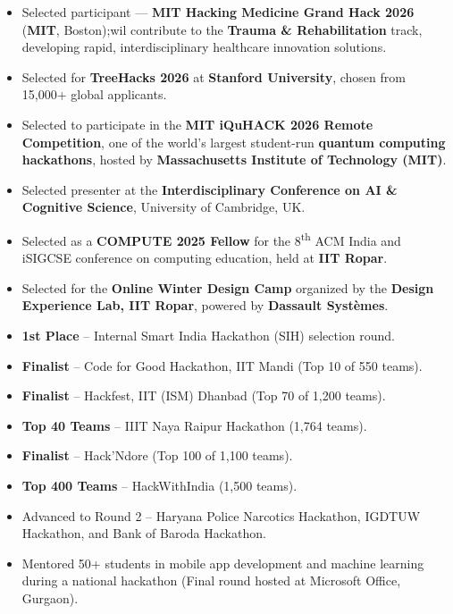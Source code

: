 \documentclass[11pt]{article}
\begin{document}
\begin{itemize}[leftmargin=*,nosep]
\item Selected participant — \textbf{MIT Hacking Medicine Grand Hack 2026} (\textbf{MIT}, Boston);wil contribute to the \textbf{Trauma \& Rehabilitation} track, developing rapid, interdisciplinary healthcare innovation solutions.

\item Selected for \textbf{TreeHacks 2026} at \textbf{Stanford University}, chosen from 15,000+ global applicants.
\item{Selected to participate in the \textbf{MIT iQuHACK 2026 Remote Competition}, one of the world’s largest student-run \textbf{quantum computing hackathons}, hosted by \textbf{Massachusetts Institute of Technology (MIT)}.}

\item Selected presenter at the \textbf{Interdisciplinary Conference on AI \& Cognitive Science}, University of Cambridge, UK.
  \item{Selected as a \textbf{COMPUTE 2025 Fellow} for the 8\textsuperscript{th} ACM India and iSIGCSE conference on computing education, held at \textbf{IIT Ropar}.}

  \item {Selected for the \textbf{Online Winter Design Camp} organized by the \textbf{Design Experience Lab, IIT Ropar}, powered by \textbf{Dassault Syst\`emes}.}

\item \textbf{1st Place} – Internal Smart India Hackathon (SIH) selection round.

\item \textbf{Finalist} – Code for Good Hackathon, IIT Mandi (Top 10 of 550 teams).

\item \textbf{Finalist} – Hackfest, IIT (ISM) Dhanbad (Top 70 of 1,200 teams).

\item \textbf{Top 40 Teams} – IIIT Naya Raipur Hackathon (1,764 teams).

\item \textbf{Finalist} – Hack’Ndore (Top 100 of 1,100 teams).

\item \textbf{Top 400 Teams} – HackWithIndia (1,500 teams).

\item Advanced to Round 2 – Haryana Police Narcotics Hackathon, IGDTUW Hackathon, and Bank of Baroda Hackathon.

\item Mentored 50+ students in mobile app development and machine learning during a national hackathon (Final round hosted at Microsoft Office, Gurgaon).

\end{itemize}

\end{document}
